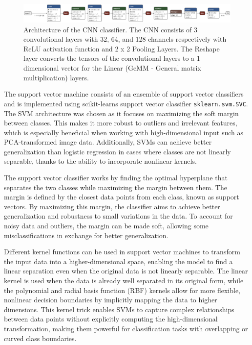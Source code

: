 \documentclass[a4, 10 pt, conference]{ieeeconf}  %
\begin{document}
\begin{figure}[htbp]
    \centering
    \includegraphics[width=\textwidth]{../images/sign_lang_model.onnx.png}
    \caption{Architecture of the CNN classifier. The CNN consists of 3 convolutional layers with 32, 64, and 128 channels respectively with ReLU activation function and 2 x 2 Pooling Layers. The Reshape layer converts the tensors of the convolutional layers to a 1 dimensional vector for the Linear (GeMM - General matrix multiplication) layers.}
    \label{fig:cnn}
\end{figure}

The support vector machine consists of an ensemble of support vector classifiers and is implemented using scikit-learns support vector classifier \texttt{sklearn.svm.SVC}. 
The SVM architecture was chosen as it focuses on maximizing the soft margin between classes. This makes it more robust to outliers and irrelevant features, which is especially beneficial when working with high-dimensional input such as PCA-transformed image data. Additionally, SVMs can achieve better generalization than logistic regression in cases where classes are not linearly separable, thanks to the ability to incorporate nonlinear kernels.

The support vector classifier works by finding the optimal hyperplane that separates the two classes while maximizing the margin between them. The margin is defined by the closest data points from each class, known as support vectors. By maximizing this margin, the classifier aims to achieve better generalization and robustness to small variations in the data. To account for noisy data and outliers, the margin can be made soft, allowing some misclassifications in exchange for better generalization.

Different kernel functions can be used in support vector machines to transform the input data into a higher-dimensional space, enabling the model to find a linear separation even when the original data is not linearly separable. The linear kernel is used when the data is already well separated in its original form, while the polynomial and radial basis function (RBF) kernels allow for more flexible, nonlinear decision boundaries by implicitly mapping the data to higher dimensions. This kernel trick enables SVMs to capture complex relationships between data points without explicitly computing the high-dimensional transformation, making them powerful for classification tasks with overlapping or curved class boundaries.
\end{document}
